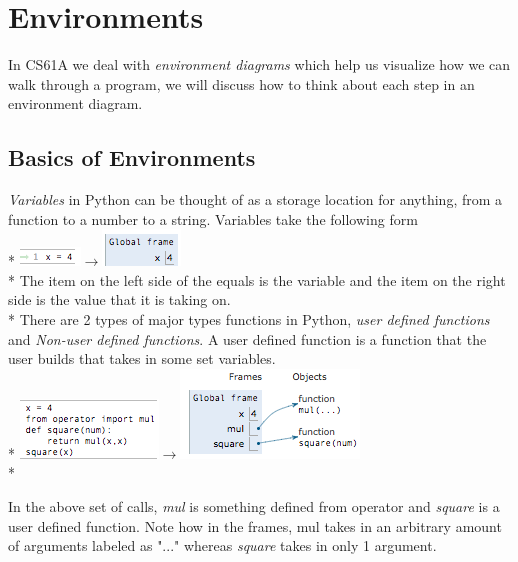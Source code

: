\documentclass{article}
\begin{document}
\section{Environments}
In CS61A we deal with \emph{environment diagrams} which help us visualize how we can walk through a program, we will discuss how to think about each step in an environment diagram.
\subsection{Basics of Environments}
\emph{Variables} in Python can be thought of as a storage location for anything, from a function to a number to a string. Variables take the following form \\*
\includegraphics[scale=.7]{../images/var1.png}{\Huge $\rightarrow$}\includegraphics[scale=.7]{../images/var2.png} \\*
The item on the left side of the equals is the variable and the item on the right side is the value that it is taking on. \\*
\bigskip
There are 2 types of major types functions in Python, \emph{user defined functions} and \emph{Non-user defined functions}. A user defined function is a function that the user builds that takes in some set variables. \\* 
\includegraphics[scale=.7]{../images/user1.png}{\Huge $\rightarrow$}\includegraphics[scale=.7]{../images/user2.png} \\* \bigskip

In the above set of calls, \emph{mul} is something defined from operator and \emph{square} is a user defined function. Note how in the frames, mul takes in an arbitrary amount of arguments labeled as "..." whereas \emph{square} takes in only 1 argument.
\end{document}
